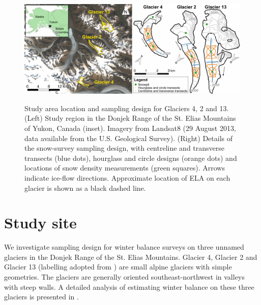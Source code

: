 \documentclass[twocolumn,letterpaper]{igs}
\begin{document}
\begin{figure}
	\centering
	\includegraphics[width =\textwidth]{PaperII-StudySite.pdf}\\
	\caption{Study area location and sampling design for Glaciers 4, 2 and 13. (Left) Study region in the Donjek Range of the St. Elias Mountains of Yukon, Canada (inset). Imagery from Landsat8 (29 August 2013, data available from the U.S. Geological Survey). (Right) Details of the snow-survey sampling design, with centreline and transverse transects (blue dots), hourglass and circle designs (orange dots) and locations of snow density measurements (green squares). Arrows indicate ice-flow directions. Approximate location of ELA on each glacier is shown as a black dashed line.}
	\label{fig:Sampling}
\end{figure}

\section{Study site}

We investigate sampling design for winter balance surveys on three unnamed glaciers in the Donjek Range of the St. Elias Mountains. Glacier 4, Glacier 2 and Glacier 13 (labelling adopted from \cite{Crompton2016}) are small alpine glaciers with simple geometries. The glaciers are generally oriented southeast-northwest in valleys with steep walls. A detailed analysis of estimating winter balance on these three glaciers is presented in \cite{Pulwicki2017}.
\end{document}
